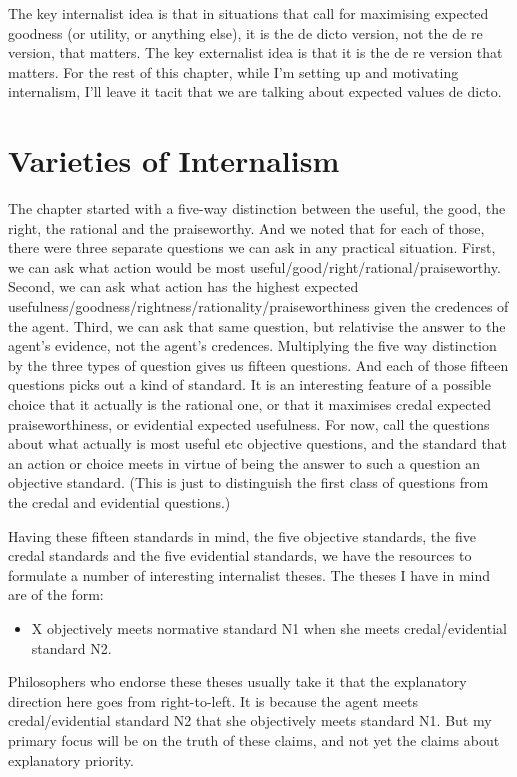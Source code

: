 \documentclass[
  10pt,
  letterpaper,
  twoside]{scrbook}
\providecommand{\tightlist}{%
  \setlength{\itemsep}{0pt}\setlength{\parskip}{0pt}}\usepackage{longtable,booktabs,array}
\begin{document}
The key internalist idea is that in situations that call for maximising
expected goodness (or utility, or anything else), it is the de dicto
version, not the de re version, that matters. The key externalist idea
is that it is the de re version that matters. For the rest of this
chapter, while I'm setting up and motivating internalism, I'll leave it
tacit that we are talking about expected values de dicto.

\section{Varieties of Internalism}\label{varietiesofinternalism}

The chapter started with a five-way distinction between the useful, the
good, the right, the rational and the praiseworthy. And we noted that
for each of those, there were three separate questions we can ask in any
practical situation. First, we can ask what action would be most
useful/good/right/rational/praiseworthy. Second, we can ask what action
has the highest expected
usefulness/goodness/rightness/rationality/praiseworthiness given the
credences of the agent. Third, we can ask that same question, but
relativise the answer to the agent's evidence, not the agent's
credences. Multiplying the five way distinction by the three types of
question gives us fifteen questions. And each of those fifteen questions
picks out a kind of standard. It is an interesting feature of a possible
choice that it actually is the rational one, or that it maximises credal
expected praiseworthiness, or evidential expected usefulness. For now,
call the questions about what actually is most useful etc objective
questions, and the standard that an action or choice meets in virtue of
being the answer to such a question an objective standard. (This is just
to distinguish the first class of questions from the credal and
evidential questions.)

Having these fifteen standards in mind, the five objective standards,
the five credal standards and the five evidential standards, we have the
resources to formulate a number of interesting internalist theses. The
theses I have in mind are of the form:

\begin{itemize}
\tightlist
\item
  X objectively meets normative standard N1 when she meets
  credal/evidential standard N2.
\end{itemize}

Philosophers who endorse these theses usually take it that the
explanatory direction here goes from right-to-left. It is because the
agent meets credal/evidential standard N2 that she objectively meets
standard N1. But my primary focus will be on the truth of these claims,
and not yet the claims about explanatory priority.
\end{document}
